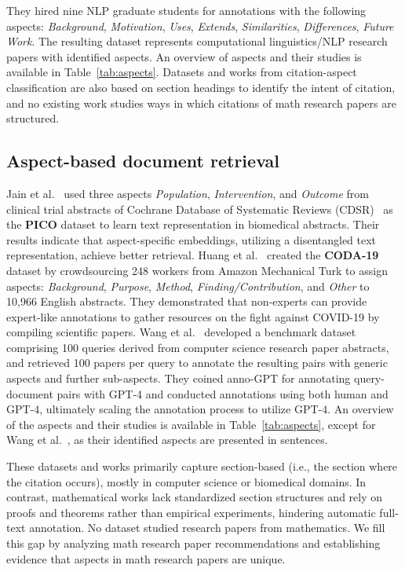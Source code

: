 \documentclass[sigconf,anonymous]{acmart}
\begin{document}
They hired nine NLP graduate students for annotations with the following aspects: \textit{Background}, \textit{Motivation}, \textit{Uses}, \textit{Extends}, \textit{Similarities}, \textit{Differences}, \textit{Future Work}.
The resulting dataset represents computational linguistics/NLP research papers with identified aspects.
An overview of aspects and their studies is available in Table~\ref{tab:aspects}.
Datasets and works from citation-aspect classification are also based on section headings to identify the intent of citation, and no existing work studies ways in which citations of math research papers are structured.

\subsection{Aspect-based document retrieval}
Jain et al.~\cite{jain2018PICObiomed} used three aspects \textit{Population}, \textit{Intervention}, and \textit{Outcome} from clinical trial abstracts of Cochrane Database of Systematic Reviews (CDSR)~\cite{starr2009origins} as the \textbf{PICO} dataset to learn text representation in biomedical abstracts.
Their results indicate that aspect-specific embeddings, utilizing a disentangled text representation, achieve better retrieval.
Huang et al.~\cite{huang2020coda} created the \textbf{CODA-19} dataset by crowdsourcing 248 workers from Amazon Mechanical Turk to assign aspects: \textit{Background}, \textit{Purpose}, \textit{Method}, \textit{Finding/Contribution}, and \textit{Other} to 10,966 English abstracts.
They demonstrated that non-experts can provide expert-like annotations to gather resources on the fight against COVID-19 by compiling scientific papers.
Wang et al.~\cite{2023DorisMae} developed a benchmark dataset comprising 100 queries derived from computer science research paper abstracts, and retrieved 100 papers per query to annotate the resulting pairs with generic aspects and further sub-aspects.
They coined anno-GPT for annotating query-document pairs with GPT-4 and conducted annotations using both human and GPT-4, ultimately scaling the annotation process to utilize GPT-4.
An overview of the aspects and their studies is available in Table~\ref{tab:aspects}, except for Wang et al.~\cite{2023DorisMae}, as their identified aspects are presented in sentences.

These datasets and works primarily capture section-based (i.e., the section where the citation occurs), mostly in computer science or biomedical domains.
In contrast, mathematical works lack standardized section structures and rely on proofs and theorems rather than empirical experiments, hindering automatic full-text annotation.
No dataset studied research papers from mathematics. 
We fill this gap by analyzing math research paper recommendations and establishing evidence that aspects in math research papers are unique.
\end{document}
